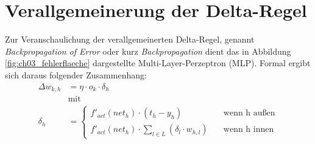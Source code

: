 \section*{Verallgemeinerung der Delta-Regel}
Zur Veranschaulichung der verallgemeinerten Delta-Regel, genannt \emph{Backpropagation of Error} oder kurz \emph{Backpropagation} dient das in Abbildung \ref{fig:ch03_fehlerflaeche} dargestellte Multi-Layer-Perzeptron (MLP).
Formal ergibt sich daraus folgender Zusammenhang:
\begin{align*}
	\Delta w_{k,h} &= \eta \cdot o_k \cdot \delta_h \\
	&\text{mit} \\
	\delta_h &=
	\begin{cases}
		f'_{act}(net_h) \cdot (t_h - y_h) 
		\quad &\text{wenn h außen} \\
		f'_{act}(net_h) \cdot \sum_{l \in L} (\delta_l \cdot w_{h,l})
		\quad &\text{wenn h innen}
	\end{cases}
\end{align*}

